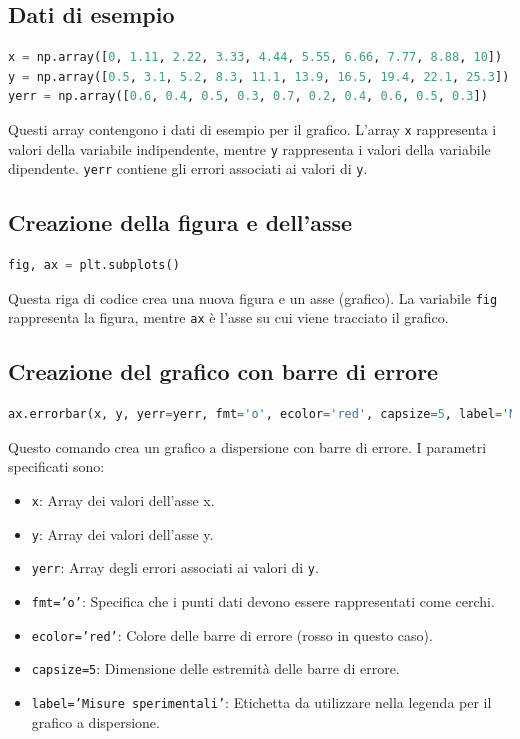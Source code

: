 \documentclass[a4paper,12pt]{article}
\begin{document}
\subsection{Dati di esempio}
\begin{lstlisting}[language=Python, caption=Dati di esempio]
x = np.array([0, 1.11, 2.22, 3.33, 4.44, 5.55, 6.66, 7.77, 8.88, 10])
y = np.array([0.5, 3.1, 5.2, 8.3, 11.1, 13.9, 16.5, 19.4, 22.1, 25.3])
yerr = np.array([0.6, 0.4, 0.5, 0.3, 0.7, 0.2, 0.4, 0.6, 0.5, 0.3])
\end{lstlisting}
Questi array contengono i dati di esempio per il grafico. L'array \texttt{x} rappresenta i valori della variabile indipendente, mentre \texttt{y} rappresenta i valori della variabile dipendente. \texttt{yerr} contiene gli errori associati ai valori di \texttt{y}.

\subsection{Creazione della figura e dell'asse}
\begin{lstlisting}[language=Python, caption=Creazione della figura e dell'asse]
fig, ax = plt.subplots()
\end{lstlisting}
Questa riga di codice crea una nuova figura e un asse (grafico). La variabile \texttt{fig} rappresenta la figura, mentre \texttt{ax} è l'asse su cui viene tracciato il grafico.

\subsection{Creazione del grafico con barre di errore}
\begin{lstlisting}[language=Python, caption=Creazione del grafico con barre di errore]
ax.errorbar(x, y, yerr=yerr, fmt='o', ecolor='red', capsize=5, label='Misure sperimentali')
\end{lstlisting}
Questo comando crea un grafico a dispersione con barre di errore. I parametri specificati sono:
\begin{itemize}
    \item \texttt{x}: Array dei valori dell'asse x.
    \item \texttt{y}: Array dei valori dell'asse y.
    \item \texttt{yerr}: Array degli errori associati ai valori di \texttt{y}.
    \item \texttt{fmt='o'}: Specifica che i punti dati devono essere rappresentati come cerchi.
    \item \texttt{ecolor='red'}: Colore delle barre di errore (rosso in questo caso).
    \item \texttt{capsize=5}: Dimensione delle estremità delle barre di errore.
    \item \texttt{label='Misure sperimentali'}: Etichetta da utilizzare nella legenda per il grafico a dispersione.
\end{itemize}
\end{document}
